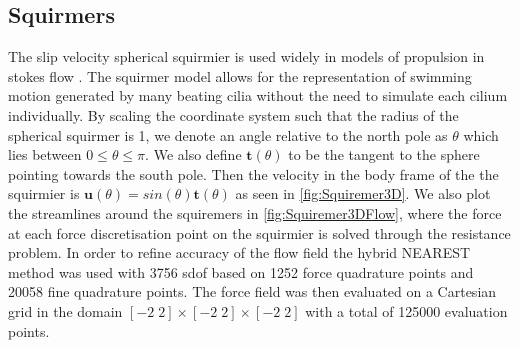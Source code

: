 \subsection{Squirmers}
The slip velocity spherical squirmier is used widely in models of propulsion in stokes flow \cite{Smith2021TheSelf-Propulsion,Lauga2020TheModel,Pedley2016SquirmersSwimming}. The squirmer model allows for the representation of swimming motion generated by many beating cilia without the need to simulate each cilium individually. By scaling the coordinate system such that the radius of the spherical squirmer is 1, we denote an angle relative to the north pole as $\theta$ which lies between $0\leq\theta\leq\pi$. We also define $\bm{t}(\theta)$ to be the tangent to the sphere pointing towards the south pole. Then the velocity in the body frame of the the squirmier is $\bm{u}(\theta) = sin(\theta)\bm{t}(\theta)$ as seen in \cref{fig:Squiremer3D}. We also plot the streamlines around the squiremers in \cref{fig:Squiremer3DFlow}, where the force at each force discretisation point on the squirmier is solved through the resistance problem. In order to refine accuracy of the flow field the hybrid NEAREST method was used with 3756 sdof based on 1252 force quadrature points and 20058 fine quadrature points. The force field was then evaluated on a Cartesian grid in the domain $[-2\; 2] \times [-2\; 2] \times [-2\; 2]$ with a total of 125000 evaluation points. 

